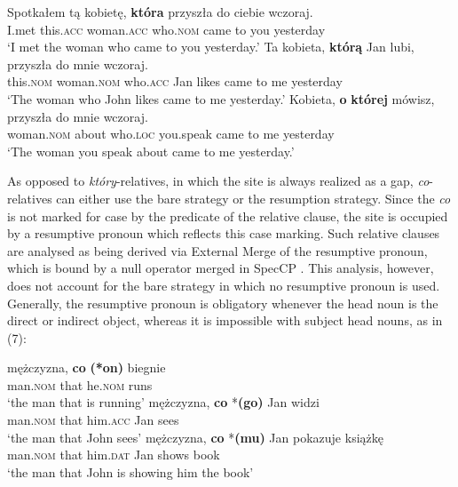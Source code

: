 \documentclass[output=paper]{langsci/langscibook}
\begin{document}
\ea%
    \label{ex:leska:6}
    \ea
    \gll Spotkałem   tą   kobietę,   \textbf{która}   przyszła  do  ciebie   wczoraj.        \\
          I.met   this.\textsc{acc}   woman.\textsc{acc}   who.\textsc{nom}   came   to  you  yesterday\\
    \glt ‘I met the woman who came to you yesterday.’
    \ex
    \gll Ta     kobieta,   \textbf{którą}   Jan  lubi,  przyszła  do  mnie  wczoraj.  \\
         this.\textsc{nom}   woman.\textsc{nom}   who.\textsc{acc}   Jan likes   came   to  me   yesterday\\
    \glt ‘The woman who John likes came to me yesterday.’
    \ex
    \gll Kobieta,   \textbf{o}  \textbf{której}   mówisz,   przyszła  do  mnie   wczoraj.\\
         woman.\textsc{nom}  about   who.\textsc{loc}   you.speak   came   to   me   yesterday\\
    \glt ‘The woman you speak about came to me yesterday.’
    \z
\z

As opposed to \textit{który}{}-relatives, in which the  site is always realized as a gap, \textit{co}{}-relatives can either use the bare strategy or the resumption strategy. Since the  \textit{co} is not marked for case by the predicate of the relative clause, the  site is occupied by a resumptive pronoun which reflects this case marking. Such relative clauses are analysed as being derived via External Merge of the resumptive pronoun, which is bound by a null operator merged in SpecCP \citep{Borer1984,Chomsky1977,Lavine2003,McCloskey1990,McCloskey2002,Merchant2004,Safir1986,Shlonsky1992}. This analysis, however, does not account for the bare strategy in which no resumptive pronoun is used. Generally, the resumptive pronoun is obligatory whenever the head noun is the direct or indirect object, whereas it is impossible with subject head nouns, as in (7):

\ea%
    \label{ex:leska:7}
    \ea
    \gll mężczyzna,   \textbf{co}   \textbf{(*on)} biegnie\\
         man.\textsc{nom}   that   he.\textsc{nom} runs\\
    \glt ‘the man that is running’
    \ex
    \gll mężczyzna,   \textbf{co} *\textbf{(go)} Jan   widzi\\
         man.\textsc{nom}   that him.\textsc{acc}   Jan   sees\\
    \glt ‘the man that John sees’
    \ex
    \gll mężczyzna,   \textbf{co} *\textbf{(mu)}   Jan   pokazuje   książkę\\
         man.\textsc{nom}   that him.\textsc{dat}   Jan   shows   book\\
    \glt ‘the man that John is showing him the book’
    \z
\z    
\end{document}
